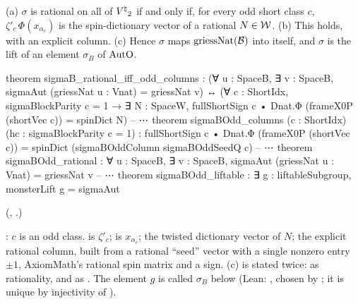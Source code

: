 \begin{theorem}\label{ch22:thm:sigmarational}
(a) $\sigma$ is rational on all of ${V^{\natural}}_2$ if and only if, for every odd short class $c$,
$\zeta'_c\,\Phi(x_{\alpha_c})$ is the spin-dictionary vector of a rational $N\in\mathcal{W}$.
(b) This holds, with an explicit column.  (c) Hence $\sigma$ maps $\mathrm{griessNat}(\mathcal{B})$ into itself, and $\sigma$
is the lift of an element $\sigma_B$ of $\mathrm{AutO}$.
\end{theorem}
\begin{leancode}
theorem sigmaB_rational_iff_odd_columns :
    (∀ u : SpaceB, ∃ v : SpaceB, sigmaAut (griessNat u : Vnat) = griessNat v) ↔
      (∀ c : ShortIdx, sigmaBlockParity c = 1 → ∃ N : SpaceW,
        fullShortSign c • Dnat.Φ (frameX0P (shortVec c)) = spinDict N)
-- ⋯
theorem sigmaBOdd_columns (c : ShortIdx) (hc : sigmaBlockParity c = 1) :
    fullShortSign c • Dnat.Φ (frameX0P (shortVec c)) =
      spinDict (sigmaBOddColumn sigmaBOddSeedQ c)
-- ⋯
theorem sigmaBOdd_rational :
    ∀ u : SpaceB, ∃ v : SpaceB, sigmaAut (griessNat u : Vnat) = griessNat v
-- ⋯
theorem sigmaBOdd_liftable : ∃ g : liftableSubgroup, monsterLift g = sigmaAut
\end{leancode}
(, .)
\begin{dictionary}
: $c$ is an odd class.   is $\zeta'_c$; 
is $x_{\alpha_c}$;  the twisted dictionary vector of $N$;  the
explicit rational column, built from a rational ``seed'' vector  with a single nonzero entry
$\pm1$, AxiomMath's rational spin matrix  and a sign.  (c) is stated twice: as rationality, and as
.  The element $g$ is called $\sigma_B$ below (Lean:
, chosen by ; it is unique by injectivity of ).
\end{dictionary}
